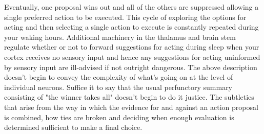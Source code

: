 Eventually, one proposal wins out and all of the others are suppressed allowing a single preferred action to be executed. This cycle of exploring the options for acting and then selecting a single action to execute is constantly repeated during your waking hours. Additional machinery in the thalamus and brain stem regulate whether or not to forward suggestions for acting during sleep when your cortex receives no sensory input and hence any suggestions for acting uninformed by sensory input are ill-advised if not outright dangerous. The above description doesn't begin to convey the complexity of what's going on at the level of individual neurons. Suffice it to say that the usual perfunctory summary consisting of "the winner takes all" doesn't begin to do it justice. The subtleties that arise from the way in which the evidence for and against an action proposal is combined, how ties are broken and deciding when enough evaluation is determined sufficient to make a final choice. 

